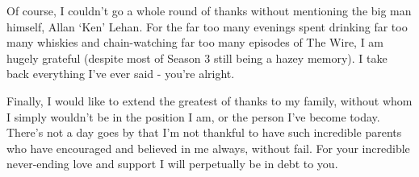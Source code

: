 \begin{acknowledgements}
\begin{spacing}{1}
Of course, I couldn't go a whole round of thanks without mentioning the big man
himself, Allan `Ken' Lehan. For the far too many evenings spent
drinking far too many whiskies and chain-watching far too many episodes of The
Wire, I am hugely grateful (despite most of Season 3 still being a hazey
memory). I take back everything I've ever said - you're alright.

Finally, I would like to extend the greatest of thanks to my family, without whom
I simply wouldn't be in the position I am, or the person I've become today.
There's not a day goes by that I'm not thankful to have such incredible parents
who have encouraged and believed in me always, without fail.
For your incredible never-ending love and support I will perpetually be in debt
to you.
\end{spacing}

\end{acknowledgements}

